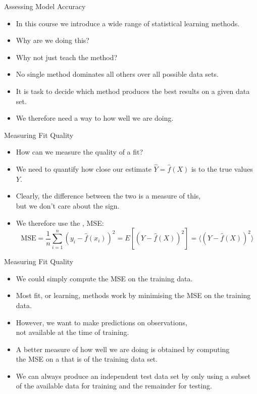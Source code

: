 \documentclass[mathserif, aspectratio=169]{beamer}
\begin{document}
\begin{frame}{Assessing Model Accuracy}
	\begin{itemize}
		\item In this course we introduce a wide range of statistical learning methods.
		\item Why are we doing this?
		\item Why not just teach the  method?
		\item No single method dominates all others over all possible data sets.
		\item It is  task to decide which method produces the best results on
			a given data set.
		\item We therefore need a way to  how well we are doing.
	\end{itemize}
\end{frame}

\begin{frame}{Measuring Fit Quality}
	\begin{itemize}
		\item How can we measure the quality of a fit?
		\item We need to quantify how close our estimate $\hat{Y} = \hat{f}(X)$ is to the
			true values $Y$.
		\item Clearly, the difference between the two is a measure of this,\\
			but we don't care about the sign.
		\item We therefore use the , MSE:
			\[ 
				\text{MSE} = \frac{1}{n}\sum_{i=1}^n (y_i - \hat{f}(x_i))^2
				= E[(Y - \hat{f}(X))^2]
				= \langle (Y - \hat{f}(X))^2 \rangle 
			\]
	\end{itemize}
\end{frame}

\begin{frame}{Measuring Fit Quality}
	\begin{itemize}
		\item We could simply compute the MSE on the training data.
		\item Most fit, or learning, methods work by minimising the MSE
			on the training data.
		\item However, we want to make predictions on  observations,\\
			not available at the time of training.
		\item A better measure of how well we are doing is obtained by computing\\
			the MSE on a  that is  of the training data set.
		\item We can always produce an independent test data set by only using a subset of 
			the available data for training and the remainder for testing.
	\end{itemize}
\end{frame}
\end{document}
